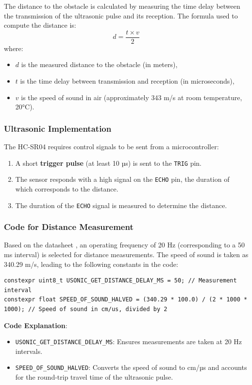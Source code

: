 The distance to the obstacle is calculated by measuring the time delay between the transmission of the ultrasonic pulse and its reception. The formula used to compute the distance is:
\begin{equation}
	d = \frac{t \times v}{2}
\end{equation}
where:
\begin{itemize}
	\item \(d\) is the measured distance to the obstacle (in meters),
	\item \(t\) is the time delay between transmission and reception (in microseconds),
	\item \(v\) is the speed of sound in air (approximately 343 m/s at room temperature, 20°C).
\end{itemize}

\subsubsection{Ultrasonic Implementation}
The HC-SR04 requires control signals to be sent from a microcontroller:
\begin{enumerate}
	\item A short \textbf{trigger pulse} (at least 10 µs) is sent to the \texttt{TRIG} pin.
	\item The sensor responds with a high signal on the \texttt{ECHO} pin, the duration of which corresponds to the distance.
	\item The duration of the \texttt{ECHO} signal is measured to determine the distance.
\end{enumerate}

\subsubsection{Code for Distance Measurement}
Based on the datasheet \cite{ultrasonic_sensor}, an operating frequency of 20 Hz (corresponding to a 50 ms interval) is selected for distance measurements. The speed of sound is taken as 340.29 m/s, leading to the following constants in the code:

\begin{lstlisting}[style=cppstyle2]
constexpr uint8_t USONIC_GET_DISTANCE_DELAY_MS = 50; // Measurement interval
constexpr float SPEED_OF_SOUND_HALVED = (340.29 * 100.0) / (2 * 1000 * 1000); // Speed of sound in cm/us, divided by 2
\end{lstlisting}

\textbf{Code Explanation}:
\begin{itemize}
\item \texttt{USONIC\_GET\_DISTANCE\_DELAY\_MS}: Ensures measurements are taken at 20 Hz intervals.
\item \texttt{SPEED\_OF\_SOUND\_HALVED}: Converts the speed of sound to cm/µs and accounts for the round-trip travel time of the ultrasonic pulse.
\end{itemize}

